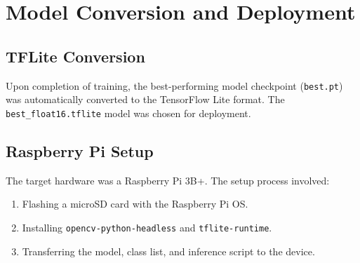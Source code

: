\section{Model Conversion and Deployment}
\subsection{TFLite Conversion}
Upon completion of training, the best-performing model checkpoint (\texttt{best.pt}) was automatically converted to the TensorFlow Lite format. The \texttt{best\_float16.tflite} model was chosen for deployment.

\subsection{Raspberry Pi Setup}
The target hardware was a Raspberry Pi 3B+. The setup process involved:
\begin{enumerate}
    \item Flashing a microSD card with the Raspberry Pi OS.
    \item Installing \texttt{opencv-python-headless} and \texttt{tflite-runtime}.
    \item Transferring the model, class list, and inference script to the device.
\end{enumerate}
